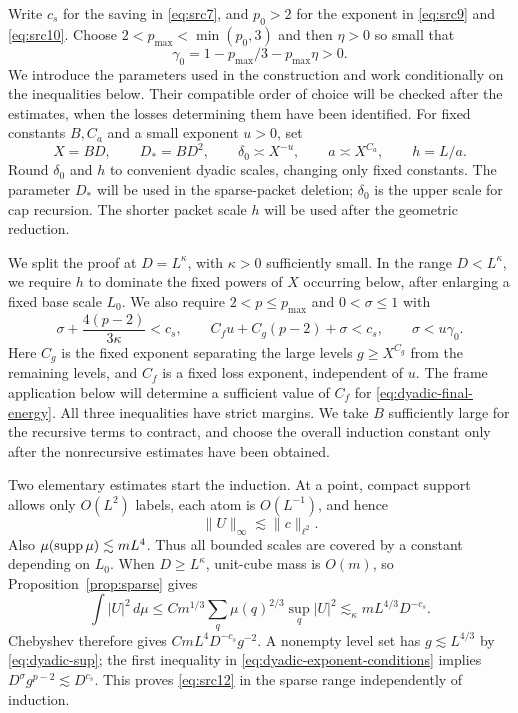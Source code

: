 Write $c_s$ for the saving in \eqref{eq:src7}, and $p_0>2$ for the exponent
in \eqref{eq:src9} and \eqref{eq:src10}. Choose
$2<p_{\max}<\min(p_0,3)$ and then $\eta>0$ so small that
\begin{equation}\label{eq:dyadic-gamma}
 \gamma_0=1-p_{\max}/3-p_{\max}\eta>0.
\end{equation}
We introduce the parameters used in the construction and work conditionally
on the inequalities below. Their compatible order of choice will be checked
after the estimates, when the losses determining them have been identified.
For fixed constants $B,C_a$ and a small exponent $u>0$, set
\begin{equation}\label{eq:dyadic-parameters}
 X=BD,\qquad D_*=BD^2,\qquad \delta_0\asymp X^{-u},
 \qquad a\asymp X^{C_a},\qquad h=L/a.
\end{equation}
Round $\delta_0$ and $h$ to convenient dyadic scales, changing only fixed
constants. The parameter $D_*$ will be used in the sparse-packet deletion;
$\delta_0$ is the upper scale for cap recursion. The shorter packet scale
$h$ will be used after the geometric reduction.

We split the proof at $D=L^\kappa$, with $\kappa>0$ sufficiently small.
In the range $D<L^\kappa$, we require $h$ to dominate the fixed powers
of $X$ occurring below, after enlarging a fixed base scale $L_0$. We also require
$2<p\leq p_{\max}$ and $0<\sigma\leq1$ with
\begin{equation}\label{eq:dyadic-exponent-conditions}
 \sigma+\frac{4(p-2)}{3\kappa}<c_s,\qquad
 C_fu+C_g(p-2)+\sigma<c_s,\qquad
 \sigma<u\gamma_0.
\end{equation}
Here $C_g$ is the fixed exponent separating the large levels
$g\geq X^{C_g}$ from the remaining levels, and $C_f$ is a fixed loss exponent, independent of $u$. The frame
application below will determine a sufficient value of $C_f$ for
\eqref{eq:dyadic-final-energy}. All three
inequalities have strict margins. We take $B$ sufficiently large for the
recursive terms to contract, and choose the overall induction constant
only after the nonrecursive estimates have been obtained.

Two elementary estimates start the induction.  At a point, compact support
allows only $O(L^2)$ labels, each atom is $O(L^{-1})$, and hence
\begin{equation}\label{eq:dyadic-sup}
 \|U\|_\infty\lesssim\|c\|_{\ell^2}.
\end{equation}
Also $\mu(\operatorname{supp}\mu)\lesssim mL^4$.  Thus all bounded scales are covered
by a constant depending on $L_0$.  When $D\geq L^\kappa$, unit-cube mass
is $O(m)$, so Proposition~\ref{prop:sparse} gives
\[
 \int|U|^2\,d\mu
 \leq C m^{1/3}\sum_q\mu(q)^{2/3}\sup_q|U|^2
 \lesssim_\kappa mL^{4/3}D^{-c_s}.
\]
Chebyshev therefore gives $CmL^4D^{-c_s}g^{-2}$.  A nonempty level set
has $g\lesssim L^{4/3}$ by \eqref{eq:dyadic-sup}; the first inequality
in \eqref{eq:dyadic-exponent-conditions} implies
$D^\sigma g^{p-2}\lesssim D^{c_s}$.  This proves
\eqref{eq:src12} in the sparse range independently of induction.

